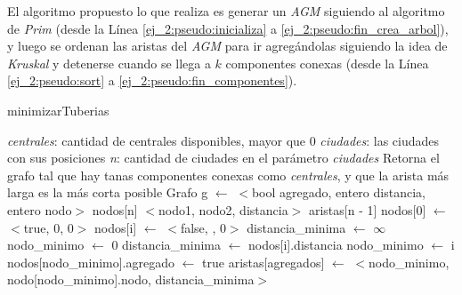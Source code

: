 El algoritmo propuesto lo que realiza es generar un \emph{AGM} siguiendo al algoritmo de \emph{Prim} (desde la L\'inea \ref{ej_2:pseudo:inicializa} a \ref{ej_2:pseudo:fin_crea_arbol}), y luego se ordenan las aristas del \emph{AGM} para ir agreg\'andolas siguiendo la idea de \emph{Kruskal} y detenerse cuando se llega a $k$ componentes conexas (desde la L\'inea \ref{ej_2:pseudo:sort} a \ref{ej_2:pseudo:fin_componentes}).

\begin{algorithm}[!h]
\caption{minimizarTuberias} \label{ej_2:pseudo}
\end{algorithm}
\begin{algorithmic}[1]
	\Require \emph{centrales}: cantidad de centrales disponibles, mayor que 0
	\Require \emph{ciudades}: las ciudades con sus posiciones
	\Require \emph{n}: cantidad de ciudades en el par\'ametro \emph{ciudades}
	\Statex
	\Ensure Retorna el grafo tal que hay tanas componentes conexas como \emph{centrales}, y que la arista m\'as larga es la m\'as corta posible
	\Statex
		\State Grafo g $\gets$  
		\State $<$bool agregado, entero distancia, entero nodo$>$  nodos[n] 
		\State $<$nodo1, nodo2, distancia$>$ aristas[n - 1]
		\Statex
		\State nodos[0] $\gets$ $<$true, 0, 0$>$ \label{ej_2:pseudo:inicializa}
		 \label{ej_2:pseudo:distancia}
			\State nodos[i] $\gets$ $<$false, , 0$>$
		\EndFor \label{ej_2:pseudo:fin_inicializa}
		\Statex
		 \label{ej_2:pseudo:crea_arbol}
			\State distancia\_minima $\gets$ $\infty$
			\State nodo\_minimo $\gets$ 0
			  \label{ej_2:pseudo:mas_cerca}
						\State distancia\_minima $\gets$ nodos[i].distancia
						\State nodo\_minimo $\gets$ i
					\EndIf
				\EndIf
			\EndFor \label{ej_2:pseudo:fin_mas_cerca}
			\Statex
			\State nodos[nodo\_minimo].agregado $\gets$ true \label{ej_2:pseudo:nodo}
			\State aristas[agregados] $\gets$ $<$nodo\_minimo, nodo[nodo\_minimo].nodo, distancia\_minima$>$  \label{ej_2:pseudo:arista}
			\Statex
			  \label{ej_2:pseudo:actualiza}

\end{algorithmic}

